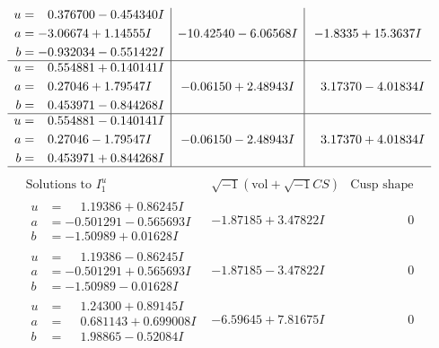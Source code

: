 \documentclass[1p]{elsarticle_modified}
\theoremstyle{definition}
\newcommand{\I}{\sqrt{-1}}
\begin{document}
$$\begin{array}{c|c|c}
\begin{aligned}
u &= \phantom{-}0.376700 - 0.454340 I \\
a &= -3.06674 + 1.14555 I \\
b &= -0.932034 - 0.551422 I\end{aligned}
 & -10.42540 - 6.06568 I & -1.8335 + 15.3637 I \\ \hline\begin{aligned}
u &= \phantom{-}0.554881 + 0.140141 I \\
a &= \phantom{-}0.27046 + 1.79547 I \\
b &= \phantom{-}0.453971 - 0.844268 I\end{aligned}
 & -0.06150 + 2.48943 I & \phantom{-}3.17370 - 4.01834 I \\ \hline\begin{aligned}
u &= \phantom{-}0.554881 - 0.140141 I \\
a &= \phantom{-}0.27046 - 1.79547 I \\
b &= \phantom{-}0.453971 + 0.844268 I\end{aligned}
 & -0.06150 - 2.48943 I & \phantom{-}3.17370 + 4.01834 I\\
 \hline 
 \end{array}$$\newpage$$\begin{array}{c|c|c}  
\text{Solutions to }I^u_{1}& \I (\text{vol} + \sqrt{-1}CS) & \text{Cusp shape}\\
 \hline 
\begin{aligned}
u &= \phantom{-}1.19386 + 0.86245 I \\
a &= -0.501291 - 0.565693 I \\
b &= -1.50989 + 0.01628 I\end{aligned}
 & -1.87185 + 3.47822 I & \phantom{-0.000000 } 0 \\ \hline\begin{aligned}
u &= \phantom{-}1.19386 - 0.86245 I \\
a &= -0.501291 + 0.565693 I \\
b &= -1.50989 - 0.01628 I\end{aligned}
 & -1.87185 - 3.47822 I & \phantom{-0.000000 } 0 \\ \hline\begin{aligned}
u &= \phantom{-}1.24300 + 0.89145 I \\
a &= \phantom{-}0.681143 + 0.699008 I \\
b &= \phantom{-}1.98865 - 0.52084 I\end{aligned}
 & -6.59645 + 7.81675 I & \phantom{-0.000000 } 0 \\ \hline\begin{aligned}

\end{aligned}
\end{array}$$
\end{document}
